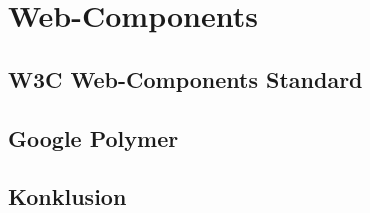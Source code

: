\section{Web-Components}
\label{sec:3_Web_Components}





\subsection{W3C Web-Components Standard}
\label{sec:3_W3C}













\subsection{Google Polymer}
\label{sec:3_Polymer}



\subsection{Konklusion}
\label{sec:3_Konklusion}



